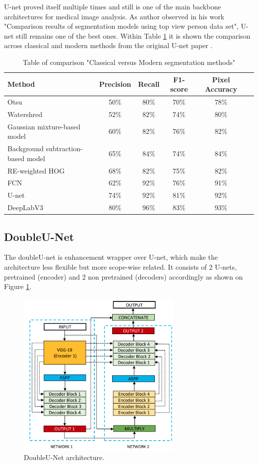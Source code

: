 U-net proved itself multiple times and still is one of the main backbone architectures for medical image analysis. As author \cite{Ahmed2020} observed in his work "Comparison results of segmentation models using top view person data set", U-net still remains one of the best ones. Within Table \ref{tab:classical_versus_modern} it is shown the comparison across classical and modern methods from the original U-net paper \cite{Ronneberger2015}.

\begin{table}[h]
\centering
\begin{tabular}{|l|c|c|c|c|c|}
\hline
Method & Precision & Recall & F1-score & Pixel Accuracy \\
\hline \hline
Otsu & 50\% & 80\% & 70\% & 78\%  \\
\hline
Watershred & 52\% & 82\% & 74\% & 80\% \\
\hline
Gaussian mixture-based model & 60\% & 82\% & 76\% & 82\%  \\
\hline
Background subtraction-based model & 65\% & 84\% & 74\% & 84\% \\
\hline
RE-weighted HOG & 68\% & 82\% & 75\% & 82\%  \\
\hline
FCN & 62\% & 92\% & 76\% & 91\%  \\
\hline
U-net & 74\% & 92\% & 81\% & 92\% \\
\hline
DeepLabV3 & 80\% & 96\% & 83\% & 93\% \\
\hline
\end{tabular}
\caption{Table of comparison "Classical versus Modern segmentation methods"}
\label{tab:classical_versus_modern}
\end{table}

\subsection{DoubleU-Net}
The doubleU-net is enhancement wrapper over U-net, which make the architecture less flexible but more scope-wise related. It consists of 2 U-nets, pretrained (encoder) and 2 non pretrained (decoders) accordingly as shown on Figure \ref{fig:double_unet}.

\begin{figure}[h]
    \centering \includegraphics[width=8cm]{images/DoubleU-Net.png}
    \caption {DoubleU-Net architecture.}
    \label{fig:double_unet}
\end{figure}

